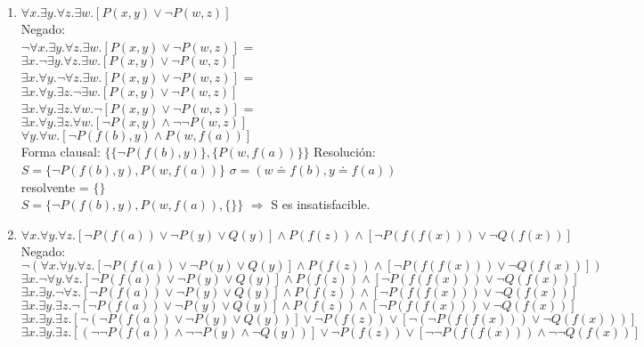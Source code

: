 \documentclass[10pt,a4paper]{article}
\begin{document}
\begin{enumerate}
    \item
    $\forall x. \exists y. \forall z. \exists w. [P(x,y) \vee \neg P(w,z)]$ \\
    Negado: \\
    $\neg \forall x. \exists y. \forall z. \exists w. [P(x,y) \vee \neg P(w,z)]$  =  $\exists x. \neg \exists y. \forall z. \exists w. [P(x,y) \vee \neg P(w,z)]$ \\
    $\exists x. \forall y. \neg \forall z. \exists w. [P(x,y) \vee \neg P(w,z)]$  =  $\exists x. \forall y. \exists z. \neg \exists w. [P(x,y) \vee \neg P(w,z)]$ \\
    $\exists x. \forall y. \exists z. \forall w. \neg [P(x,y) \vee \neg P(w,z)]$  =  $\exists x. \forall y. \exists z. \forall w. [\neg P(x,y) \wedge \neg \neg P(w,z)]$ \\
    $\forall y. \forall w. [\neg P(f(b),y) \wedge P(w,f(a))]$ \\
    Forma clausal: $\{\{ \neg P(f(b),y) \}, \{P(w,f(a)) \} \}$
    Resolución: \\
    $S=\{ \neg P(f(b),y), P(w,f(a)) \}$ $\sigma=(w \doteq f(b), y \doteq f(a))$ resolvente = $ \{\} $ \\
    $S=\{ \neg P(f(b),y), P(w,f(a)), \{\} \}$ $\Rightarrow$ S es insatisfacible.
    \item
    $\forall x. \forall y. \forall z. [\neg P(f(a)) \vee \neg P(y) \vee Q(y)] \wedge P(f(z)) \wedge [\neg P(f(f(x))) \vee \neg Q(f(x))]$ \\
    Negado: \\
    $\neg (\forall x. \forall y. \forall z. [\neg P(f(a)) \vee \neg P(y) \vee Q(y)] \wedge P(f(z)) \wedge [\neg P(f(f(x))) \vee \neg Q(f(x))])$ \\
    $\exists x. \neg \forall y. \forall z. [\neg P(f(a)) \vee \neg P(y) \vee Q(y)] \wedge P(f(z)) \wedge [\neg P(f(f(x))) \vee \neg Q(f(x))]$ \\
    $\exists x. \exists y. \neg \forall z. [\neg P(f(a)) \vee \neg P(y) \vee Q(y)] \wedge P(f(z)) \wedge [\neg P(f(f(x))) \vee \neg Q(f(x))]$ \\
    $\exists x. \exists y. \exists z. \neg [\neg P(f(a)) \vee \neg P(y) \vee Q(y)] \wedge P(f(z)) \wedge [\neg P(f(f(x))) \vee \neg Q(f(x))]$ \\
    $\exists x. \exists y. \exists z. [ \neg (\neg P(f(a)) \vee \neg P(y) \vee Q(y))] \vee \neg P(f(z)) \vee [\neg (\neg P(f(f(x))) \vee \neg Q(f(x)))]$ \\
    $\exists x. \exists y. \exists z. [ (\neg \neg P(f(a)) \wedge \neg \neg P(y) \wedge \neg Q(y))] \vee \neg P(f(z)) \vee [\neg \neg P(f(f(x))) \wedge \neg \neg Q(f(x))]$ \\

\end{enumerate}
\end{document}
